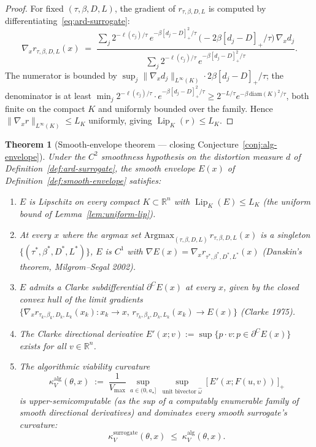 \documentclass[11pt,a4paper]{article}
\theoremstyle{plain}
\newtheorem{theorem}{Theorem}[section]
\theoremstyle{definition}
\theoremstyle{remark}
\newcommand{\kk}{\kappa_{\!V}}
\newcommand{\RR}{\mathbb{R}}
\DeclareMathOperator{\Lip}{Lip}
\begin{document}
\begin{proof}
For fixed $(\tau, \beta, D, L)$, the gradient of $r_{\tau,\beta,D,L}$ is
computed by differentiating~\eqref{eq:ard-surrogate}:
\[
  \nabla_x r_{\tau,\beta,D,L}(x) \;=\;
  \frac{\sum_j 2^{-\ell(c_j)/\tau}\, e^{-\beta [d_j - D]_+^2/\tau}\,
  \bigl(-2\beta [d_j - D]_+/\tau\bigr)\, \nabla_x d_j}
  {\sum_j 2^{-\ell(c_j)/\tau}\, e^{-\beta [d_j - D]_+^2/\tau}}.
\]
The numerator is bounded by $\sup_j \|\nabla_x d_j\|_{L^\infty(K)} \cdot
2\beta [d_j - D]_+/\tau$; the denominator is at least $\min_j
2^{-\ell(c_j)/\tau} \cdot e^{-\beta [d_j - D]_+^2/\tau} \geq 2^{-L/\tau}
e^{-\beta \,\mathrm{diam}(K)^2 / \tau}$, both finite on the compact $K$ and uniformly
bounded over the family. Hence $\|\nabla_x r\|_{L^\infty(K)} \leq L_K$
uniformly, giving $\Lip_K(r) \leq L_K$.
\end{proof}

\begin{theorem}[Smooth-envelope theorem --- closing
Conjecture~\ref{conj:alg-envelope}]
\label{thm:smooth-envelope}
Under the $C^2$ smoothness hypothesis on the distortion measure $d$ of
Definition~\ref{def:ard-surrogate}, the smooth envelope $E(x)$ of
Definition~\ref{def:smooth-envelope} satisfies:
\begin{enumerate}[leftmargin=*,itemsep=2pt]
\item[(a)] $E$ is Lipschitz on every compact $K \subset \RR^n$ with
  $\Lip_K(E) \leq L_K$ (the uniform bound of Lemma~\ref{lem:uniform-lip}).
\item[(b)] At every $x$ where the argmax set
  $\mathrm{Argmax}_{(\tau,\beta,D,L)}\, r_{\tau,\beta,D,L}(x)$ is a
  singleton $\{(\tau^*,\beta^*,D^*,L^*)\}$, $E$ is $C^1$ with
  $\nabla E(x) = \nabla_x r_{\tau^*,\beta^*,D^*,L^*}(x)$ (Danskin's
  theorem, Milgrom--Segal 2002).
\item[(c)] $E$ admits a Clarke subdifferential $\partial^C E(x)$ at every
  $x$, given by the closed convex hull of the limit gradients
  $\{\nabla_x r_{\tau_k,\beta_k,D_k,L_k}(x_k) : x_k \to x,\, r_{\tau_k,
  \beta_k, D_k, L_k}(x_k) \to E(x)\}$ (Clarke 1975).
\item[(d)] The Clarke directional derivative
  $E'(x; v) := \sup\{p \cdot v : p \in \partial^C E(x)\}$ exists for all
  $v \in \RR^n$.
\item[(e)] The algorithmic viability curvature
\begin{equation}\label{eq:kappa-alg}
  \kk^{\mathrm{alg}}(\theta, x) \;:=\;
  \frac{1}{V_{\max}}\, \sup_{a \in (0, a_\star]}\,
  \sup_{\text{unit bivector } \hat\omega}\,
  \bigl[\,E'(x; F(u, v))\,\bigr]_+
\end{equation}
is upper-semicomputable (as the sup of a computably enumerable family
of smooth directional derivatives) and dominates every smooth surrogate's
curvature:
\[
  \kk^{\mathrm{surrogate}}(\theta, x) \;\leq\; \kk^{\mathrm{alg}}(\theta, x).
\]
\end{enumerate}
\end{theorem}
\end{document}
